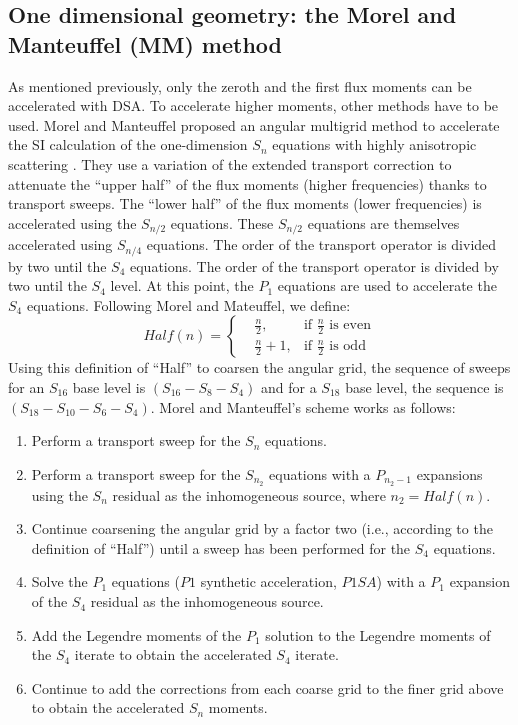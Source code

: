 \subsection{One dimensional geometry: the Morel and Manteuffel (MM) method}
As mentioned previously, only the zeroth and the first flux moments can be
accelerated with DSA. To accelerate higher moments, other methods have to be
used. Morel and Manteuffel proposed an angular multigrid method to accelerate
the SI calculation of the one-dimension $S_n$ equations with highly
anisotropic scattering \cite{multigrid_1d}. They use a variation of the
extended transport correction \cite{lathrop} to attenuate the ``upper half''
of the flux moments (higher frequencies) thanks to transport sweeps. The
``lower half'' of the flux moments (lower frequencies) is accelerated using
the $S_{n/2}$ equations. These $S_{n/2}$ equations are themselves accelerated
using $S_{n/4}$ equations. The order of the transport operator is divided by
two until the $S_4$ equations. The order of the transport operator is divided
by two until the $S_4$ level. At this point, the $P_1$ equations are used to
accelerate the $S_4$ equations. Following Morel and Mateuffel, we define:
\begin{equation}
Half(n) = \left\{
\begin{aligned}
&\frac{n}{2}, &\textrm{if }\frac{n}{2}\textrm{ is even}\\
&\frac{n}{2}+1, &\textrm{if }\frac{n}{2}\textrm{ is odd}
\end{aligned}
\right.
\end{equation}
Using this definition of ``Half'' to coarsen the angular grid, the sequence of
sweeps for an $S_{16}$ base level is $(S_{16}-S_8-S_4)$ and for a $S_{18}$
base level, the sequence is $(S_{18}-S_{10}-S_6-S_4)$. Morel and Manteuffel's
scheme works as follows:
\begin{enumerate}
\item Perform a transport sweep for the $S_n$ equations.
\item Perform a transport sweep for the $S_{n_2}$ equations with a $P_{n_2-1}$
expansions using the $S_n$ residual as the inhomogeneous source, where
$n_2=Half(n)$.
\item Continue coarsening the angular grid by a factor two (i.e., according to
the definition of ``Half'') until a sweep has been performed for the $S_4$
equations.
\item Solve the $P_1$ equations ($P1$ synthetic acceleration, $P1SA$) with a
$P_1$ expansion of the $S_4$ residual as the inhomogeneous source.
\item Add the Legendre moments of the $P_1$ solution to the Legendre moments
of the $S_4$ iterate to obtain the accelerated $S_4$ iterate.
\item Continue to add the corrections from each coarse grid to the finer grid
above to obtain the accelerated $S_n$ moments.
\end{enumerate}
